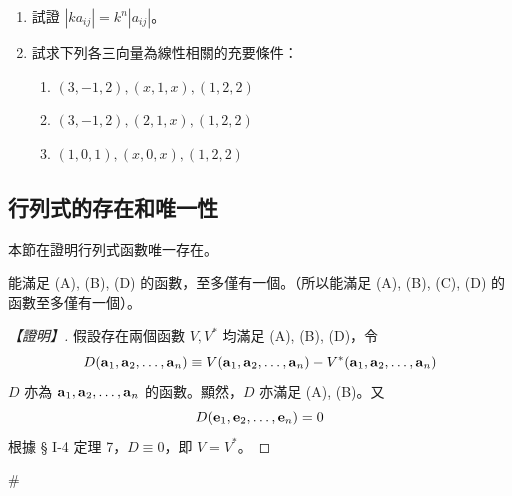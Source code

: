 \begin{enumerate}[label=\arabic*., leftmargin=2em]
  \item[\textbf{*9.}] 試證 $|k a_{ij}| = k^n |a_{ij}|$。

  \item 試求下列各三向量為線性相關的充要條件：
  \begin{enumerate}[label=(\roman*)]
    \item $(3, -1, 2), (x, 1, x), (1, 2, 2)$
    \item $(3, -1, 2), (2, 1, x), (1, 2, 2)$
    \item $(1, 0, 1), (x, 0, x), (1, 2, 2)$
  \end{enumerate}
\end{enumerate}

\subsection{行列式的存在和唯一性}\label{sec:b6s-1-5}
\resetsectcounters

本節在證明行列式函數唯一存在。

\begin{theorem}\label{thm:b6s-1-10}
能滿足 (A), (B), (D) 的函數，至多僅有一個。（所以能滿足 (A), (B), (C), (D) 的函數至多僅有一個）。
\end{theorem}

\begin{proof}[【證明】]
假設存在兩個函數 $V, V^*$ 均滿足 (A), (B), (D)，令
\[ D(\boldsymbol{\mathbf{a}}_1, \boldsymbol{\mathbf{a}}_2, \dots, \boldsymbol{\mathbf{a}}_n) \equiv V(\boldsymbol{\mathbf{a}}_1, \boldsymbol{\mathbf{a}}_2, \dots, \boldsymbol{\mathbf{a}}_n) - V^*(\boldsymbol{\mathbf{a}}_1, \boldsymbol{\mathbf{a}}_2, \dots, \boldsymbol{\mathbf{a}}_n) \]
$D$ 亦為 $\boldsymbol{\mathbf{a}}_1, \boldsymbol{\mathbf{a}}_2, \dots, \boldsymbol{\mathbf{a}}_n$ 的函數。顯然，$D$ 亦滿足 (A), (B)。又
\[ D(\boldsymbol{\mathbf{e}}_1, \boldsymbol{\mathbf{e}}_2, \dots, \boldsymbol{\mathbf{e}}_n) = 0 \]
根據 § I-4 定理 7，$D \equiv 0$，即 $V = V^*$。
\end{proof}\hfill$\#$

